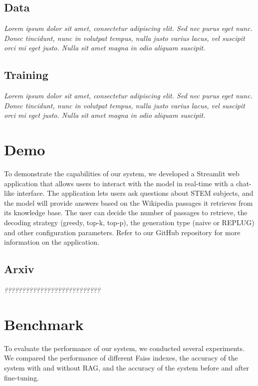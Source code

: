 \documentclass[11pt]{article}
\begin{document}
\subsection{Data}

\textit{Lorem ipsum dolor sit amet, consectetur adipiscing elit. Sed nec purus eget
nunc. Donec tincidunt, nunc in volutpat tempus, nulla justo varius lacus, vel
suscipit orci mi eget justo. Nulla sit amet magna in odio aliquam suscipit.}

\subsection{Training}

\textit{Lorem ipsum dolor sit amet, consectetur adipiscing elit. Sed nec purus eget
nunc. Donec tincidunt, nunc in volutpat tempus, nulla justo varius lacus, vel
suscipit orci mi eget justo. Nulla sit amet magna in odio aliquam suscipit.}

\section{Demo}

To demonstrate the capabilities of our system, we developed a Streamlit web application
that allows users to interact with the model in real-time with a chat-like interface. 
The application lets users ask questions about STEM subjects, and the model will provide answers 
based on the Wikipedia passages it retrieves from its knowledge base. 
The user can decide the number of passages to retrieve, the decoding strategy (greedy, top-k, top-p), 
the generation type (naive or REPLUG) and other configuration parameters.
Refer to our GitHub repository for more information on the application.

\subsection{Arxiv}

\textit{???????????????????????????}

\section{Benchmark}

To evaluate the performance of our system, we conducted several experiments.
We compared the performance of different Faiss indexes, the accuracy of the system with and without RAG,
and the accuracy of the system before and after fine-tuning.
\end{document}
